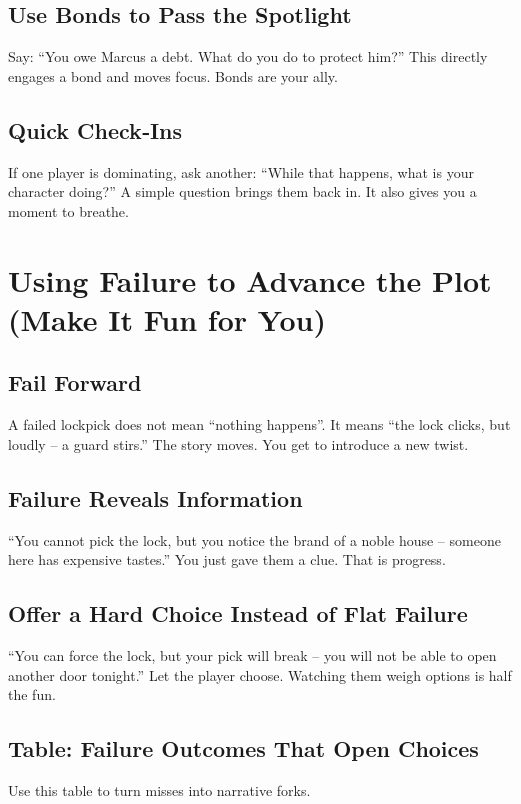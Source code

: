 \subsection*{Use Bonds to Pass the Spotlight}
Say: “You owe Marcus a debt. What do you do to protect him?” This directly engages a bond and moves focus. Bonds are your ally.

\subsection*{Quick Check‑Ins}
If one player is dominating, ask another: “While that happens, what is your character doing?” A simple question brings them back in. It also gives you a moment to breathe.

\section{Using Failure to Advance the Plot (Make It Fun for You)}

\subsection*{Fail Forward}
A failed lockpick does not mean “nothing happens”. It means “the lock clicks, but loudly – a guard stirs.” The story moves. You get to introduce a new twist.

\subsection*{Failure Reveals Information}
“You cannot pick the lock, but you notice the brand of a noble house – someone here has expensive tastes.” You just gave them a clue. That is progress.

\subsection*{Offer a Hard Choice Instead of Flat Failure}
“You can force the lock, but your pick will break – you will not be able to open another door tonight.” Let the player choose. Watching them weigh options is half the fun.

\subsection*{Table: Failure Outcomes That Open Choices}
Use this table to turn misses into narrative forks.

